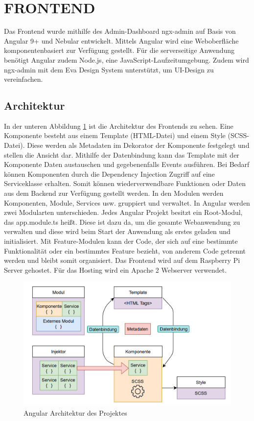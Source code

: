 \section{FRONTEND}\label{ch:frontend}

Das Frontend wurde mithilfe des Admin-Dashboard ngx-admin auf Basis von Angular 9+ und Nebular entwickelt. Mittels Angular wird eine Weboberfläche komponentenbasiert zur Verfügung gestellt. Für die serverseitige Anwendung benötigt Angular zudem Node.js, eine JavaScript-Laufzeitumgebung. Zudem wird ngx-admin mit dem Eva Design System unterstützt, um UI-Design zu vereinfachen. 

\subsection{Architektur}

In der unteren Abbildung \ref{fig:frontend} ist die Architektur des Frontends zu sehen. Eine Komponente besteht aus einem Template (HTML-Datei) und einem Style (SCSS-Datei). Diese werden als Metadaten im Dekorator der Komponente festgelegt und stellen die Ansicht dar. Mithilfe der Datenbindung kann das Template mit der Komponente Daten austauschen und gegebenenfalls Events ausführen. Bei Bedarf können Komponenten durch die Dependency Injection Zugriff auf eine Serviceklasse erhalten. Somit können wiederverwendbare Funktionen oder Daten aus dem Backend zur Verfügung gestellt werden. In den Modulen werden Komponenten, Module, Services usw. gruppiert und verwaltet. In Angular werden zwei Modularten unterschieden. Jedes Angular Projekt besitzt ein Root-Modul, das app.module.ts heißt. Diese ist dazu da, um die gesamte Webanwendung zu verwalten und diese wird beim Start der Anwendung als erstes geladen und initialisiert. Mit Feature-Modulen kann der Code, der sich auf eine bestimmte Funktionalität oder ein bestimmtes Feature bezieht, von anderem Code getrennt werden und bleibt somit organisiert.
Das Frontend wird auf dem Raspberry Pi Server gehostet. Für das Hosting wird ein Apache 2 Webserver verwendet.
\begin{figure}[thpb]
      \centering
      \includegraphics[scale=0.55]{abbildungen/frontend_architecture.PNG}
      \caption{Angular Architektur des Projektes}
      \label{fig:frontend}
 \end{figure}


